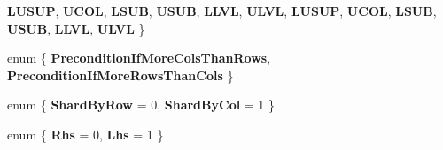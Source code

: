 \begin{DoxyCompactItemize}
{\bfseries L\+U\+S\+UP}, 
{\bfseries U\+C\+OL}, 
{\bfseries L\+S\+UB}, 
{\bfseries U\+S\+UB}, 
\newline
{\bfseries L\+L\+VL}, 
{\bfseries U\+L\+VL}, 
{\bfseries L\+U\+S\+UP}, 
{\bfseries U\+C\+OL}, 
\newline
{\bfseries L\+S\+UB}, 
{\bfseries U\+S\+UB}, 
{\bfseries L\+L\+VL}, 
{\bfseries U\+L\+VL}
 \}
\item 
\mbox{\label{namespace_eigen_1_1internal_a7fe8d8799919d7d9864773eeb0f3ac41}} 
enum \{ {\bfseries Precondition\+If\+More\+Cols\+Than\+Rows}, 
{\bfseries Precondition\+If\+More\+Rows\+Than\+Cols}
 \}
\item 
\mbox{\label{namespace_eigen_1_1internal_a65c095d39674894af469f86bf1c7155b}} 
enum \{ {\bfseries Shard\+By\+Row} = 0, 
{\bfseries Shard\+By\+Col} = 1
 \}
\item 
\mbox{\label{namespace_eigen_1_1internal_a9ea96f5a5fb79e136e1de5b07280f8b1}} 
enum \{ {\bfseries Rhs} = 0, 
{\bfseries Lhs} = 1
 \}
\end{DoxyCompactItemize}
